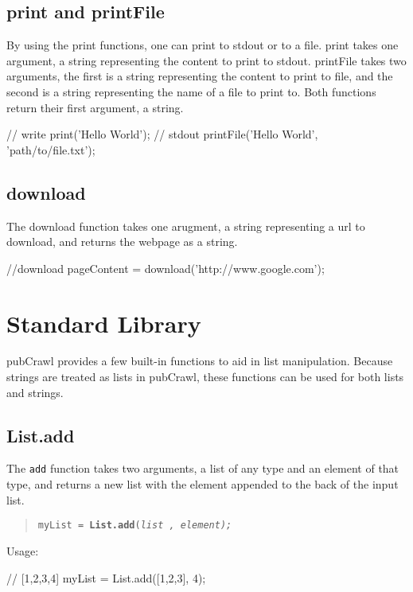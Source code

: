 \documentclass[oneside]{book}
\begin{document}
\subsection{print and printFile}
By using the print functions, one can print to stdout or to a file. print takes one argument, a string representing the content to print to stdout. printFile takes two arguments, the first is a string representing the content to print to file, and the second is a string representing the name of a file to print to. Both functions return their first argument, a string.\\
\begin{mdframed}[hidealllines=true,backgroundcolor=gray!10,skipbelow=.5em,skipabove=.5em]
\begin{code}
// write
print('Hello World'); // stdout
printFile('Hello World', 'path/to/file.txt');
\end{code}
\end{mdframed}

\subsection{download}
The download function takes one arugment, a string representing a url to download, and returns the webpage as a string.\\
\begin{mdframed}[hidealllines=true,backgroundcolor=gray!10,skipbelow=.5em,skipabove=.5em]
\begin{code}
//download
pageContent = download('http://www.google.com');
\end{code}
\end{mdframed}


\section{Standard Library}
pubCrawl provides a few built-in functions to aid in list manipulation.
Because strings are treated as lists in pubCrawl, these functions can be used for both lists and strings.

\subsection{List.add}
The \texttt{add} function takes two arguments, a list of any type and an element of that type, and returns a new list with the element appended to the back of the input list.
\begin{quote}
\texttt{myList = }\texttt{\textbf{List.add}}\texttt{(}\texttt{\emph{list
, element);}}
\end{quote}
Usage:
\begin{mdframed}
[hidealllines=true,backgroundcolor=gray!10,skipbelow=.5em,skipabove=.5em]
\begin{code}
// [1,2,3,4]
myList = List.add([1,2,3], 4);
\end{code}
\end{mdframed}
\end{document}
